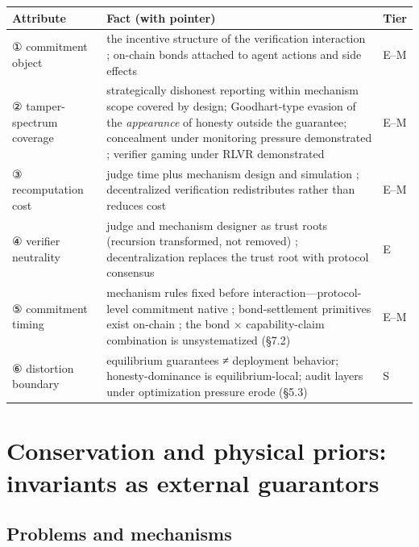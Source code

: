 \documentclass[11pt,a4paper]{article}
\begin{document}
\begin{table}[htbp]
\centering
\footnotesize
\setlength{\tabcolsep}{3.5pt}
\renewcommand{\arraystretch}{1.18}
\begin{tabularx}{0.985\textwidth}{>{\raggedright\arraybackslash}p{} >{\raggedright\arraybackslash}X >{\raggedright\arraybackslash}p{}}
\toprule
\textbf{Attribute} & \textbf{Fact (with pointer)} & \textbf{Tier} \\
\midrule
① commitment object & the incentive structure of the verification interaction \cite{key09,key10}; on-chain bonds attached to agent actions and side effects \cite{key48,key49,key50,key51} & E–M \\
② tamper-spectrum coverage & strategically dishonest reporting within mechanism scope covered by design; Goodhart-type evasion of the \textit{appearance} of honesty outside the guarantee; concealment under monitoring pressure demonstrated \cite{key30}; verifier gaming under RLVR demonstrated \cite{key47} & E–M \\
③ recomputation cost & judge time plus mechanism design and simulation \cite{key09}; decentralized verification redistributes rather than reduces cost \cite{key44,key45,key46} & E–M \\
④ verifier neutrality & judge and mechanism designer as trust roots (recursion transformed, not removed) \cite{key09,key10}; decentralization replaces the trust root with protocol consensus \cite{key44,key45,key46} & E \\
⑤ commitment timing & mechanism rules fixed before interaction—protocol-level commitment native \cite{key09,key10}; bond-settlement primitives exist on-chain \cite{key48,key49,key50,key51}; the bond × capability-claim combination is unsystematized (§7.2) & E–M \\
⑥ distortion boundary & equilibrium guarantees ≠ deployment behavior; honesty-dominance is equilibrium-local; audit layers under optimization pressure erode (§5.3) & S \\
\bottomrule
\end{tabularx}
\end{table}

\section{Conservation and physical priors: invariants as external guarantors}

\subsection{Problems and mechanisms}
\end{document}
